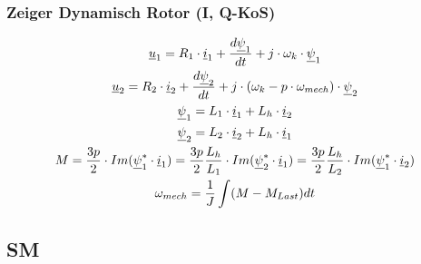 \subsubsection{Zeiger Dynamisch Rotor (I, Q-KoS)}
{\setlength{\jot}{3pt}
\begin{gather*}
\underline{u}_1 = R_1 \cdot \underline{i}_1 + \frac{d\underline{\psi}_1}{dt} + j \cdot \omega_k \cdot \underline{\psi}_1 \\
\underline{u}_2 = R_2 \cdot \underline{i}_2 + \frac{d\underline{\psi}_2}{dt} + j \cdot (\omega_k - p \cdot \omega_{mech}) \cdot \underline{\psi}_2 \\
\underline{\psi}_1 = L_1 \cdot \underline{i}_1 + L_h \cdot \underline{i}_2 \\
\underline{\psi}_2 = L_2 \cdot \underline{i}_2 + L_h \cdot \underline{i}_1 \\
M = \frac{3p}{2} \cdot Im(\underline{\psi}_1^* \cdot \underline{i}_1) = \frac{3p}{2} \frac{L_h}{L_1} \cdot Im(\underline{\psi}_2^* \cdot \underline{i}_1) = \frac{3p}{2} \frac{L_h}{L_2} \cdot Im(\underline{\psi}_1^* \cdot \underline{i}_2) \\
\omega_{mech} = \frac{1}{J} \int (M - M_{Last}) dt
\end{gather*}}

\columnbreak
\subsection{SM}
